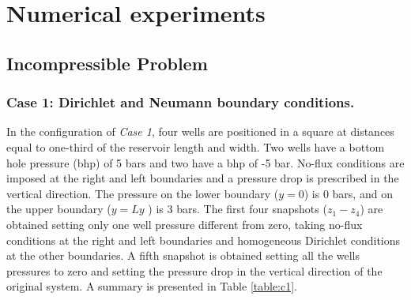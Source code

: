 \documentclass[12pt]{article}
\begin{document}
\newpage
\section{Numerical experiments}\label{numexp}
\subsection{Incompressible Problem}
\subsubsection*{Case 1: Dirichlet and Neumann boundary conditions.}
In the configuration of \emph{Case 1}, four wells are positioned in a square at distances equal 
to one-third of the reservoir length and width. Two wells have a bottom hole pressure (bhp) of 5 bars and two have 
a bhp of -5 bar. No-flux conditions are imposed at the right and left boundaries and a pressure drop
is prescribed in the vertical direction. The pressure on the lower boundary ($y=0$) is 0 bars, and on
the upper boundary ($y=Ly$ ) is 3 bars. 
The first four snapshots ($z_1-z_4$) are obtained setting only one well pressure
different from zero, taking no-flux conditions at the right and left boundaries and 
homogeneous Dirichlet conditions at the other boundaries. A fifth snapshot is obtained 
setting all the wells pressures to zero and setting the pressure drop in the vertical 
direction of the original system. 
A summary is presented in Table \ref{table:c1}.
\renewcommand{\arraystretch}{1.5}
\end{document}
